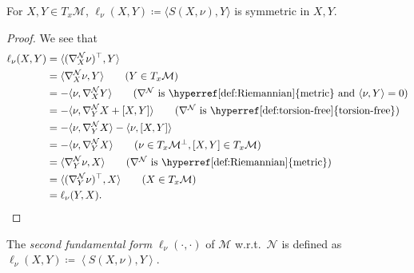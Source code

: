 \begin{lemma}\label{lma:2nd-fundamental-form}
	For \(X, Y\in T_x \mathcal{M} \), \(\ell _\nu (X, Y) \coloneqq \langle S(X, \nu) , Y\rangle \) is symmetric in \(X, Y\).
\end{lemma}
\begin{proof}
	We see that
	\begin{align*}
		\ell _\nu (X, Y)
		 & = \langle (\nabla ^\mathcal{N} _X \nu )^{\top}, Y \rangle                                                                                                 \\
		 & = \langle \nabla _X^{\mathcal{N} } \nu , Y \rangle \tag{\(Y\in T_x \mathcal{M}\)}                                                                         \\
		 & = - \langle \nu , \nabla ^\mathcal{N} _X Y \rangle \tag{\(\nabla ^\mathcal{N} \) is \hyperref[def:Riemannian]{metric} and \(\langle \nu , Y \rangle=0 \)} \\
		 & = - \langle \nu , \nabla ^\mathcal{N} _Y X + [X, Y] \rangle \tag{\(\nabla ^\mathcal{N} \) is \hyperref[def:torsion-free]{torsion-free}}                   \\
		 & = - \langle \nu , \nabla ^\mathcal{N} _Y X \rangle - \langle \nu , [X, Y] \rangle                                                                         \\
		 & = - \langle \nu , \nabla ^\mathcal{N} _Y X \rangle \tag{\(\nu \in T_x \mathcal{M} ^{\perp}, [X, Y]\in T_x \mathcal{M}\)}                                  \\
		 & = \langle \nabla _Y^{\mathcal{N} } \nu , X \rangle \tag{\(\nabla ^\mathcal{N} \) is \hyperref[def:Riemannian]{metric}}                                    \\
		 & = \langle (\nabla _Y^{\mathcal{N} } \nu)^{\top} , X \rangle \tag{\(X\in T_x \mathcal{M} \)}                                                               \\
		 & = \ell _\nu (Y, X).
	\end{align*}
\end{proof}

\begin{definition}\label{def:2nd-fundamental-form}
	The \emph{second fundamental form} \(\ell _\nu (\cdot, \cdot)\) of \(\mathcal{M} \) w.r.t.\ \(\mathcal{N} \) is defined as \(\ell _\nu (X, Y) \coloneqq \left\langle S(X, \nu ), Y \right\rangle \).
\end{definition}

